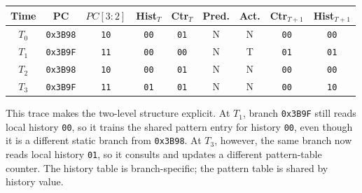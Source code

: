     {\small
\begin{center}
    \setlength{\tabcolsep}{4pt}
    \renewcommand{\arraystretch}{1.15}
    \begin{tabular}{|c|c|c|c|c|c|c|c|c|}
        \hline
        Time & PC & $PC[3:2]$ & Hist$_T$ & Ctr$_T$ & Pred.
        & Act.
        & Ctr$_{T+1}$ & Hist$_{T+1}$ \\
        \hline
        $T_0$ & \texttt{0x3B98} & \texttt{10} & \texttt{00} & \texttt{01} & N & N & \texttt{00} & \texttt{00} \\
        \hline
        $T_1$ & \texttt{0x3B9F} & \texttt{11} & \texttt{00} & \texttt{00} & N & T & \texttt{01} & \texttt{01} \\
        \hline
        $T_2$ & \texttt{0x3B98} & \texttt{10} & \texttt{00} & \texttt{01} & N & N & \texttt{00} & \texttt{00} \\
        \hline
        $T_3$ & \texttt{0x3B9F} & \texttt{11} & \texttt{01} & \texttt{01} & N & N & \texttt{00} & \texttt{10} \\
        \hline
    \end{tabular}
\end{center}}

This trace makes the two-level structure explicit.
At $T_1$, branch \texttt{0x3B9F} still reads local history \texttt{00}, so it trains the shared pattern entry for history \texttt{00}, even though it is a different static branch from \texttt{0x3B98}.
At $T_3$, however, the same branch now reads local history \texttt{01}, so it consults and updates a different pattern-table counter.
The history table is branch-specific; the pattern table is shared by history value.


